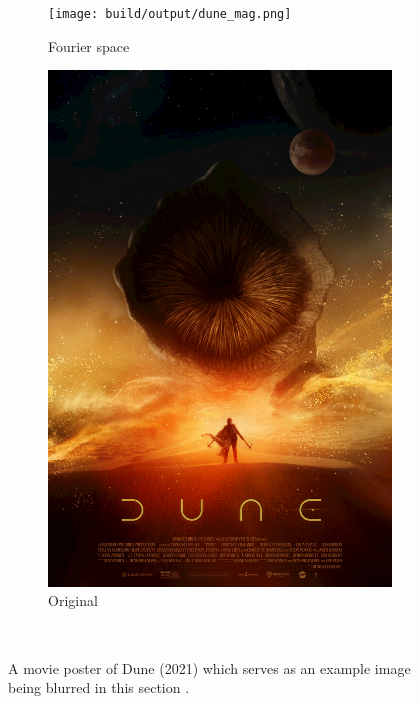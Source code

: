 \begin{figure}[htbp]
    \centering
    \begin{subfigure}[h]{.49\linewidth}
        \centering
        \texttt{[image: build/output/dune\_mag.png]}
        \caption{Fourier space}
    \end{subfigure}
    \begin{subfigure}[h]{.49\linewidth}
        \centering
        \includegraphics[width=.9\linewidth]{images/dune.png}
        \caption{Original}
    \end{subfigure}\
    \caption{A movie poster of Dune (2021) which serves as an example image being blurred in this section \cite{dune}.}
    \label{fig:dune_orig}
\end{figure}

